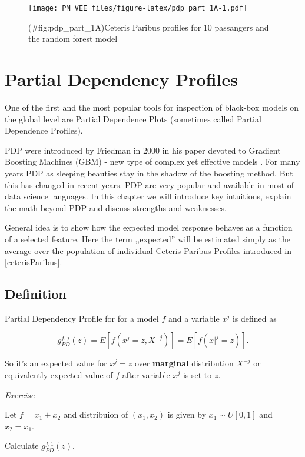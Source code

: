\documentclass[12pt,]{krantz}
\theoremstyle{definition}
\theoremstyle{definition}
\theoremstyle{definition}
\theoremstyle{remark}
\begin{document}
\begin{figure}
\centering
\texttt{[image: PM\_VEE\_files/figure-latex/pdp\_part\_1A-1.pdf]}
\caption{(\#fig:pdp\_part\_1A)Ceteris Paribus profiles for 10 passangers
and the random forest model}
\end{figure}

\hypertarget{partialDependenceProfiles}{%
\section{Partial Dependency Profiles}\label{partialDependenceProfiles}}

One of the first and the most popular tools for inspection of black-box
models on the global level are Partial Dependence Plots (sometimes
called Partial Dependence Profiles).

PDP were introduced by Friedman in 2000 in his paper devoted to Gradient
Boosting Machines (GBM) - new type of complex yet effective models
\citep{Friedman00greedyfunction}. For many years PDP as sleeping
beauties stay in the shadow of the boosting method. But this has changed
in recent years. PDP are very popular and available in most of data
science languages. In this chapter we will introduce key intuitions,
explain the math beyond PDP and discuss strengths and weaknesses.

General idea is to show how the expected model response behaves as a
function of a selected feature. Here the term ,,expected'' will be
estimated simply as the average over the population of individual
Ceteris Paribus Profiles introduced in \ref{ceterisParibus}.

\hypertarget{definition}{%
\subsection{Definition}\label{definition}}

Partial Dependency Profile for for a model \(f\) and a variable \(x^j\)
is defined as

\[
g_{PD}^{f, j}(z) = E[f(x^j=z, X^{-j})] = E[f(x|^j=z)].
\]

So it's an expected value for \(x^j = z\) over \textbf{marginal}
distribution \(X^{-j}\) or equivalently expected value of \(f\) after
variable \(x^j\) is set to \(z\).

\emph{Exercise}

Let \(f = x_1 + x_2\) and distribuion of \((x_1, x_2)\) is given by
\(x_1 \sim U[0,1]\) and \(x_2=x_1\).

Calculate \(g_{PD}^{f, 1}(z)\).
\end{document}
